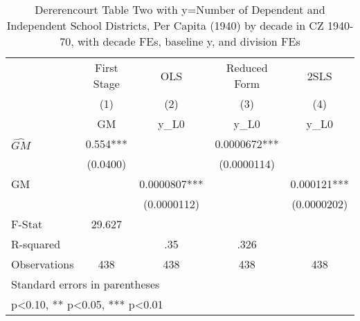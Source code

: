 \begin{table}[htbp]\centering
\def\sym#1{\ifmmode^{#1}\else\(^{#1}\)\fi}
\caption{Dererencourt Table Two with y=Number of Dependent and Independent School Districts, Per Capita (1940) by decade in CZ 1940-70, with decade FEs, baseline y, and division FEs}
\begin{tabular}{l*{4}{c}}
\toprule
                    & First Stage   &         OLS   &Reduced Form   &        2SLS   \\
                    &\multicolumn{1}{c}{(1)}&\multicolumn{1}{c}{(2)}&\multicolumn{1}{c}{(3)}&\multicolumn{1}{c}{(4)}\\
                    &\multicolumn{1}{c}{GM}&\multicolumn{1}{c}{y\_L0}&\multicolumn{1}{c}{y\_L0}&\multicolumn{1}{c}{y\_L0}\\
\midrule
$\hat{GM}$          &       0.554***&               &   0.0000672***&               \\
                    &    (0.0400)   &               & (0.0000114)   &               \\
\addlinespace
GM                  &               &   0.0000807***&               &    0.000121***\\
                    &               & (0.0000112)   &               & (0.0000202)   \\
\midrule
F-Stat              &      29.627   &               &               &               \\
R-squared           &               &         .35   &        .326   &               \\
Observations        &         438   &         438   &         438   &         438   \\
\bottomrule
\multicolumn{5}{l}{\footnotesize Standard errors in parentheses}\\
\multicolumn{5}{l}{\footnotesize * p<0.10, ** p<0.05, *** p<0.01}\\
\end{tabular}
\end{table}

